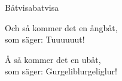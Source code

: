 \begin{song}{Båtvisa}{batvisa}
\begin{vers}
Och så kommer det en ångbåt,   \\
som säger: Tuuuuuut!\\
\end{vers}
\begin{vers}
Å så kommer det en ubåt,\\
som säger: Gurgeliblurgeliglur!\\
\end{vers}
\end{song}
